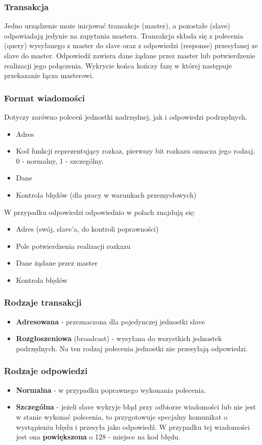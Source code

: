 \documentclass[a4paper,twoside]{article}
\begin{document}
		\subsubsection{Transakcja}
		Jedno urządzenie może inicjować transakcje (master), a pozostałe (slave) odpowiadają jedynie na zapytania mastera. Transakcja składa się z polecenia (query) wysyłanego z master do slave oraz z odpowiedzi (response) przesyłanej ze slave do master. Odpowiedź zawiera dane żądane przez master lub potwierdzenie realizacji jego połączenia. Wykrycie końca kończy fazę w której następuje przekazanie łącza masterowi.\\
		\subsubsection{Format wiadomości}
		Dotyczy zarówno poleceń jednostki nadrzędnej, jak i odpowiedzi podrzędnych.
		\begin{itemize}
			\item Adres
			\item Kod funkcji reprezentujący rozkaz, pierwszy bit rozkazu oznacza jego rodzaj. 0 - normalny, 1 - szczególny.
			\item Dane
			\item Kontrola błędów (dla pracy w warunkach przemysłowych)
		\end{itemize}
		W przypadku odpowiedzi odpowiednio w polach znajdują się:
		\begin{itemize}
			\item Adres (swój, slave'a, do kontroli poprawności)
			\item Pole potwierdzenia realizacji rozkazu
			\item Dane żądane przez master
			\item Kontrola błędów
		\end{itemize}
		\subsubsection{Rodzaje transakcji}
			\begin{itemize}
				\item \textbf{Adresowana} - przeznaczona dla pojedynczej jednostki slave
				\item \textbf{Rozgłoszeniowa} (broadcast) - wysyłana do wszystkich jednostek podrzędnych. Na ten rodzaj polecenia jednostki nie przesyłają odpowiedzi.
			\end{itemize}
		\subsubsection{Rodzaje odpowiedzi}
			\begin{itemize}
				\item \textbf{Normalna} - w przypadku poprawnego wykonania polecenia.
				\item \textbf{Szczególna} - jeżeli slave wykryje błąd przy odbiorze wiadomości lub nie jest w stanie wykonać polecenia, to przygotowuje specjalny komunikat o wystąpieniu błędu i przesyła jako odpowiedź. W przypadku tej wiadomości jest ona \textbf{powiększona} o 128 - miejsce na kod błędu.
			\end{itemize}
\end{document}
